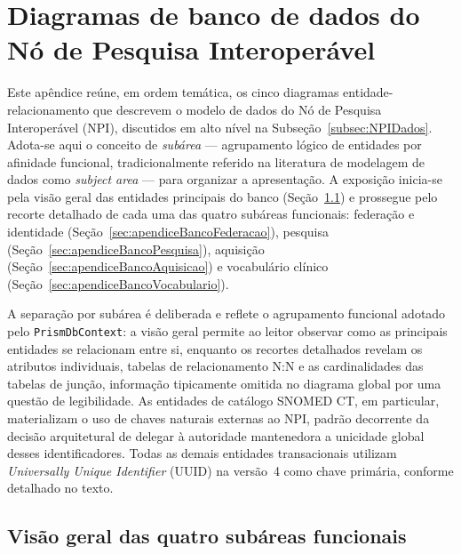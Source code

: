 
\chapter{Diagramas de banco de dados do Nó de Pesquisa Interoperável}\label{cap:apendiceDiagramasBanco}

Este apêndice reúne, em ordem temática, os cinco diagramas entidade-relacionamento que descrevem o modelo de dados do Nó de Pesquisa Interoperável (NPI), discutidos em alto nível na Subseção~\ref{subsec:NPIDados}. Adota-se aqui o conceito de \textit{subárea} --- agrupamento lógico de entidades por afinidade funcional, tradicionalmente referido na literatura de modelagem de dados como \textit{subject area} --- para organizar a apresentação. A exposição inicia-se pela visão geral das entidades principais do banco (Seção~\ref{sec:apendiceBancoVisaoGeral}) e prossegue pelo recorte detalhado de cada uma das quatro subáreas funcionais: federação e identidade (Seção~\ref{sec:apendiceBancoFederacao}), pesquisa (Seção~\ref{sec:apendiceBancoPesquisa}), aquisição (Seção~\ref{sec:apendiceBancoAquisicao}) e vocabulário clínico (Seção~\ref{sec:apendiceBancoVocabulario}).

A separação por subárea é deliberada e reflete o agrupamento funcional adotado pelo \texttt{PrismDbContext}: a visão geral permite ao leitor observar como as principais entidades se relacionam entre si, enquanto os recortes detalhados revelam os atributos individuais, tabelas de relacionamento N:N e as cardinalidades das tabelas de junção, informação tipicamente omitida no diagrama global por uma questão de legibilidade. As entidades de catálogo SNOMED CT, em particular, materializam o uso de chaves naturais externas ao NPI, padrão decorrente da decisão arquitetural de delegar à autoridade mantenedora a unicidade global desses identificadores. Todas as demais entidades transacionais utilizam \textit{Universally Unique Identifier} (UUID) na versão~4 como chave primária, conforme detalhado no texto.

\section{Visão geral das quatro subáreas funcionais}\label{sec:apendiceBancoVisaoGeral}

